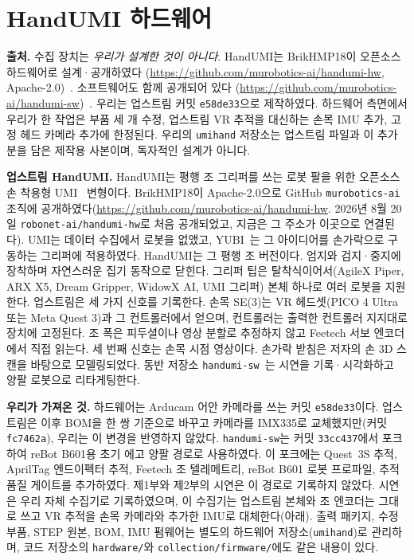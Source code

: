 \documentclass[conference,10pt]{IEEEtran}
\begin{document}
\section{HandUMI 하드웨어}\label{sec:hw}
\textbf{출처.} 수집 장치는 \emph{우리가 설계한 것이 아니다}. HandUMI는 BrikHMP18이 오픈소스 하드웨어로 설계·공개하였다
(\url{https://github.com/murobotics-ai/handumi-hw}, Apache-2.0)~\cite{handumi_hw}. 소프트웨어도 함께 공개되어 있다
(\url{https://github.com/murobotics-ai/handumi-sw})~\cite{handumi_sw}. 우리는 업스트림 커밋 \texttt{e58de33}으로 제작하였다.
하드웨어 측면에서 우리가 한 작업은 부품 세 개 수정, 업스트림 VR 추적을 대신하는 손목 IMU 추가, 고정 헤드 카메라 추가에 한정된다.
우리의 \texttt{umihand} 저장소는 업스트림 파일과 이 추가분을 담은 제작용 사본이며, 독자적인 설계가 아니다.

\textbf{업스트림 HandUMI.} HandUMI는 평행 조 그리퍼를 쓰는 로봇 팔을 위한 오픈소스 손 착용형 UMI~\cite{chi2024umi} 변형이다.
BrikHMP18이 Apache-2.0으로 GitHub \texttt{murobotics-ai} 조직에 공개하였다(\url{https://github.com/murobotics-ai/handumi-hw}.
2026년 8월 20일 \texttt{robonet-ai/handumi-hw}로 처음 공개되었고, 지금은 그 주소가 이곳으로 연결된다). UMI는 데이터 수집에서 로봇을
없앴고, YUBI~\cite{ohkawa2026yubi}는 그 아이디어를 손가락으로 구동하는 그리퍼에 적용하였다. HandUMI는 그 평행 조 버전이다. 엄지와
검지·중지에 장착하며 자연스러운 집기 동작으로 닫힌다. 그리퍼 팁은 탈착식이어서(AgileX Piper, ARX X5, Dream Gripper, WidowX AI,
UMI 그리퍼) 본체 하나로 여러 로봇을 지원한다. 업스트림은 세 가지 신호를 기록한다. 손목 SE(3)는 VR 헤드셋(PICO 4 Ultra 또는 Meta
Quest 3)과 그 컨트롤러에서 얻으며, 컨트롤러는 출력한 컨트롤러 지지대로 장치에 고정된다. 조 폭은 피두셜이나 영상 분할로 추정하지
않고 Feetech 서보 엔코더에서 직접 읽는다. 세 번째 신호는 손목 시점 영상이다. 손가락 받침은 저자의 손 3D 스캔을 바탕으로 모델링되었다.
동반 저장소 \texttt{handumi-sw}~\cite{handumi_sw}는 시연을 기록·시각화하고 양팔 로봇으로 리타게팅한다.

\textbf{우리가 가져온 것.} 하드웨어는 Arducam 어안 카메라를 쓰는 커밋 \texttt{e58de33}이다. 업스트림은 이후 BOM을 한 쌍 기준으로 바꾸고
카메라를 IMX335로 교체했지만(커밋 \texttt{fc7462a}), 우리는 이 변경을 반영하지 않았다. \texttt{handumi-sw}는 커밋 \texttt{33cc437}에서
포크하여 reBot B601용 초기 에고 양팔 경로로 사용하였다. 이 포크에는 Quest~3S 추적, AprilTag 엔드이펙터 추적, Feetech 조 텔레메트리,
reBot B601 로봇 프로파일, 추적 품질 게이트를 추가하였다. 제1부와 제2부의 시연은 이 경로로 기록하지 않았다. 시연은 우리 자체
수집기로 기록하였으며, 이 수집기는 업스트림 본체와 조 엔코더는 그대로 쓰고 VR 추적을 손목 카메라와 추가한 IMU로 대체한다(아래).
출력 패키지, 수정 부품, STEP 원본, BOM, IMU 펌웨어는 별도의 하드웨어 저장소(\texttt{umihand})로 관리하며, 코드 저장소의
\texttt{hardware/}와 \texttt{collection/firmware/}에도 같은 내용이 있다.
\end{document}
